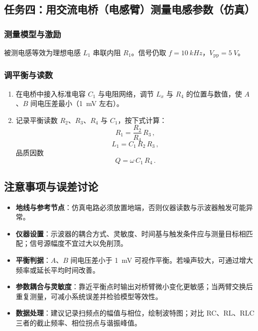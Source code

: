 \documentclass[a4paper,8pt,twocolumn]{article}
\begin{document}
\subsection{任务四：用交流电桥（电感臂）测量电感参数（仿真）}
\subsubsection*{测量模型与激励}
被测电感等效为理想电感 $L_1$ 串联内阻 $R_1$。信号仍取 $f=\SI{10}{kHz}$，$V_{\mathrm{pp}}=\SI{5}{V}$。

\subsubsection*{调平衡与读数}
\begin{enumerate}
  \item 在电桥中接入标准电容 $C_1$ 与电阻网络，调节 $L_x$ 与 $R_4$ 的位置与数值，使 $A$、$B$ 间电压差最小（\SI{1}{mV} 左右）。
  \item 记录平衡读数 $R_2$、$R_3$、$R_4$ 与 $C_1$，按下式计算：
  \begin{equation}
    R_1=\frac{R_2}{R_4}\,R_3\,, \tag{G4.4}
  \end{equation}
  \begin{equation}
    L_1=C_1\,R_2\,R_3\,, \tag{G4.5}
  \end{equation}
  品质因数
  \begin{equation}
    Q=\omega\,C_1\,R_4\,. \tag{G4.6}
  \end{equation}
\end{enumerate}

\subsection{注意事项与误差讨论}
\begin{itemize}
  \item \textbf{地线与参考节点}：仿真电路必须放置地端，否则仪器读数与示波器触发可能异常。
  \item \textbf{仪器设置}：示波器的耦合方式、灵敏度、时间基与触发条件应与测量目标相匹配；信号源幅度不宜过大以免削顶。
  \item \textbf{平衡判据}：$A$、$B$ 间电压差小于 \SI{1}{mV} 可视作平衡。若噪声较大，可通过增大频率或延长平均时间改善。
  \item \textbf{参数耦合与灵敏度}：靠近平衡点时输出对桥臂微小变化更敏感；当两臂交换后重复测量，可减小系统误差并检验模型等效性。
  \item \textbf{数据处理}：建议记录扫频点的幅值与相位，绘制波特图；对比 RC、RL、RLC 三者的截止频率、相位拐点与谐振峰值。
\end{itemize}
\end{document}
